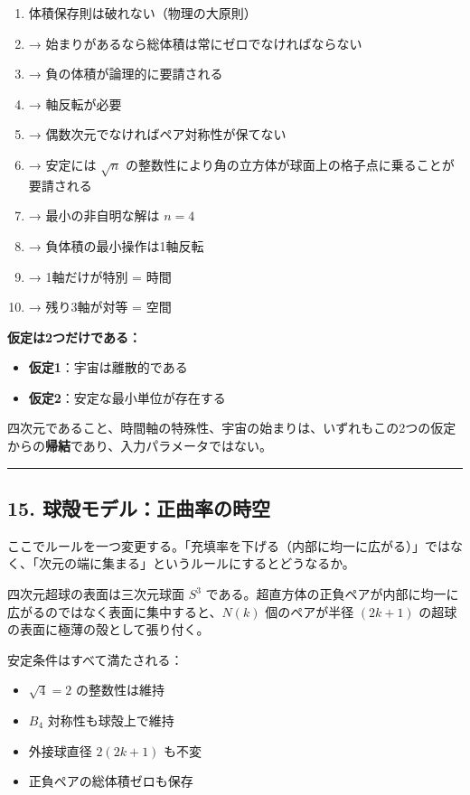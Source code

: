 \documentclass[a4paper,11pt]{ltjsarticle}
\theoremstyle{definition}
\providecommand{\tightlist}{\setlength{\itemsep}{0pt}\setlength{\parskip}{0pt}}
\begin{document}
\begin{enumerate}
\def\labelenumi{\arabic{enumi}.}
\tightlist
\item
  体積保存則は破れない（物理の大原則）
\item
  → 始まりがあるなら総体積は常にゼロでなければならない
\item
  → 負の体積が論理的に要請される
\item
  → 軸反転が必要
\item
  → 偶数次元でなければペア対称性が保てない
\item
  → 安定には \(\sqrt{n}\)
  の整数性により角の立方体が球面上の格子点に乗ることが要請される
\item
  → 最小の非自明な解は \(n = 4\)
\item
  → 負体積の最小操作は1軸反転
\item
  → 1軸だけが特別 = 時間
\item
  → 残り3軸が対等 = 空間
\end{enumerate}

\textbf{仮定は2つだけである：}

\begin{itemize}
\tightlist
\item
  \textbf{仮定1}：宇宙は離散的である
\item
  \textbf{仮定2}：安定な最小単位が存在する
\end{itemize}

四次元であること、時間軸の特殊性、宇宙の始まりは、いずれもこの2つの仮定からの\textbf{帰結}であり、入力パラメータではない。

\begin{center}\rule{0.5\linewidth}{0.5pt}\end{center}

\subsection{15.
球殻モデル：正曲率の時空}\label{ux7403ux6bbbux30e2ux30c7ux30ebux6b63ux66f2ux7387ux306eux6642ux7a7a}

ここでルールを一つ変更する。「充填率を下げる（内部に均一に広がる）」ではなく、「次元の端に集まる」というルールにするとどうなるか。

四次元超球の表面は三次元球面 \(S^3\)
である。超直方体の正負ペアが内部に均一に広がるのではなく表面に集中すると、\(N(k)\)
個のペアが半径 \((2k+1)\) の超球の表面に極薄の殻として張り付く。

安定条件はすべて満たされる：

\begin{itemize}
\tightlist
\item
  \(\sqrt{4} = 2\) の整数性は維持
\item
  \(B_4\) 対称性も球殻上で維持
\item
  外接球直径 \(2(2k+1)\) も不変
\item
  正負ペアの総体積ゼロも保存
\end{itemize}
\end{document}
